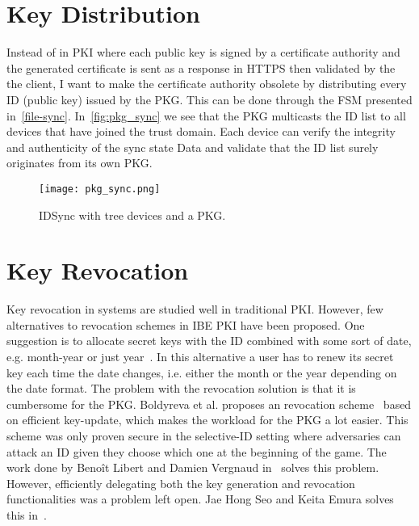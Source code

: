 \section{Key Distribution}\label{key-distribution}
Instead of in \gls{PKI} where each public key is signed by a certificate authority and the generated certificate is sent as a response in \gls{HTTPS} then validated by the the client, I want to make the certificate authority obsolete by distributing every \gls{ID} (public key) issued by the \gls{PKG}.
This can be done through the \gls{FSM} presented in~\autoref{file-sync}.
In~\autoref{fig:pkg_sync} we see that the \gls{PKG} multicasts the \gls{ID} list to all devices that have joined the trust domain.
Each device can verify the integrity and authenticity of the sync state Data and validate that the \gls{ID} list surely originates from its own \gls{PKG}.
\begin{figure}[ht]
  \centering
  \texttt{[image: pkg\_sync.png]}
  \caption{IDSync with tree devices and a PKG.}
  \label{fig:pkg_sync}
\end{figure}


\section{Key Revocation}
Key revocation in systems are studied well in traditional \gls{PKI}.
However, few alternatives to revocation schemes in \gls{IBE} \gls{PKI} have been proposed.
One suggestion is to allocate secret keys with the \gls{ID} combined with some sort of date, e.g. month-year or just year~\cite[section 1.1.1]{DBLP:conf/crypto/BonehF01}. 
In this alternative a user has to renew its secret key each time the date changes, i.e. either the month or the year depending on the date format.
The problem with the revocation solution is that it is cumbersome for the \gls{PKG}.
Boldyreva et al. proposes an revocation scheme~\cite{DBLP:journals/iacr/BoldyrevaGK12} based on efficient key-update, which makes the workload for the \gls{PKG} a lot easier. 
This scheme was only proven secure in the selective-ID setting where adversaries can attack an \gls{ID} given they choose which one at the beginning of the game.
The work done by Beno\^{i}t Libert and Damien Vergnaud in~\cite{DBLP:conf/ctrsa/LibertV09} solves this problem. 
However, efficiently delegating both the key generation and revocation functionalities was a problem left open.
Jae Hong Seo and Keita Emura solves this in~\cite{DBLP:journals/iacr/SeoE13a}.

